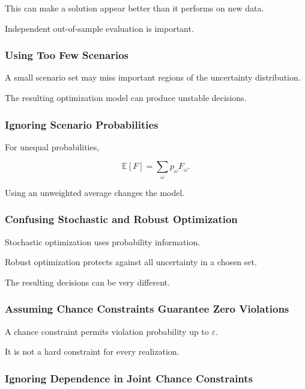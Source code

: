 This can make a solution appear better than it performs on new data.

Independent out-of-sample evaluation is important.

\subsubsection{Using Too Few Scenarios}

A small scenario set may miss important regions of the uncertainty
distribution.

The resulting optimization model can produce unstable decisions.

\subsubsection{Ignoring Scenario Probabilities}

For unequal probabilities,

\[
\boxed{
\mathbb{E}[F]
=
\sum_\omega
p_\omega F_\omega.
}
\]

Using an unweighted average changes the model.

\subsubsection{Confusing Stochastic and Robust Optimization}

Stochastic optimization uses probability information.

Robust optimization protects against all uncertainty in a chosen set.

The resulting decisions can be very different.

\subsubsection{Assuming Chance Constraints Guarantee Zero Violations}

A chance constraint permits violation probability up to \(\varepsilon\).

It is not a hard constraint for every realization.

\subsubsection{Ignoring Dependence in Joint Chance Constraints}

